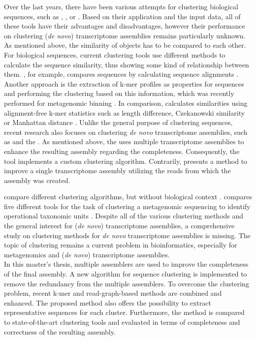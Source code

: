 \documentclass[12pt,a4paper,english]{article}
\begin{document}
	Over the last years, there have been various attempts for clustering biological sequences, such as \cdhit \citep{cd-hit:06, cd-hit:12}, \uclust \citep{uclust:10}, \linclust \citep{linclust:18} or \mclust \citep{meshclust:18}. Based on their application and the input data, all of these tools have their advantages and disadvantages, however their performance on clustering (\textit{de novo}) transcriptome assemblies remains particularly unknown.
	As mentioned above, the similarity of objects has to be compared to each other. For biological sequences, current clustering tools use different methods to calculate the sequence similarity, thus showing some kind of relationship between them.
	\cdhit, for example, compares sequences by calculating sequence alignments \citep{cd-hit:12}.
	Another approach is the extraction of k-mer profiles as properties for sequences and performing the clustering based on this information, which was recently performed for metagenomic binning \citep{binning:16}.
	In comparison, \mclust calculates similarities using alignment-free k-mer statistics such as length difference, Czekanowski similarity or Manhattan distance \citep{meshclust:18}.
	Unlike the general purpose of clustering sequences, recent research also focuses on clustering \textit{de novo} transcriptome assemblies, such as \grouper \citep{Grouper:18} and the \orp.
	As mentioned above, the \orp uses multiple transcriptome assemblies to enhance the resulting assembly regarding the completeness. Consequently, the tool implements a custom clustering algorithm.
	Contrarily, \grouper presents a method to improve a single transcriptome assembly utilizing the reads from which the assembly was created.
	
	\citeauthor{comprehensive-clustering:15} compare different clustering algorithms, but without biological context \citep{comprehensive-clustering:15}.
	\citeauthor{clustering_review:18} compares five different tools for the task of clustering a metagenomic sequencing to identify operational taxonomic units \citep{clustering_review:18}. Despite all of the various clustering methods and the general interest for (\textit{de novo}) transcriptome assemblies, a comprehensive study on clustering methods for \textit{de novo} transcriptome assemblies is missing. The topic of clustering remains a current problem in bioinformatics, especially for metagenomics and (\textit{de novo}) transcriptome assemblies.\\
	
	\noindent
	In this master's thesis, multiple assemblers are used to improve the completeness of the final assembly. A new algorithm for sequence clustering is implemented to remove the redundancy from the multiple assemblers. To overcome the clustering problem, recent k-mer and read-graph-based methods are combined and enhanced. The proposed method also offers the possibility to extract representative sequences for each cluster. Furthermore, the method is compared to state-of-the-art clustering tools and evaluated in terms of completeness and correctness of the resulting assembly.
\end{document}
